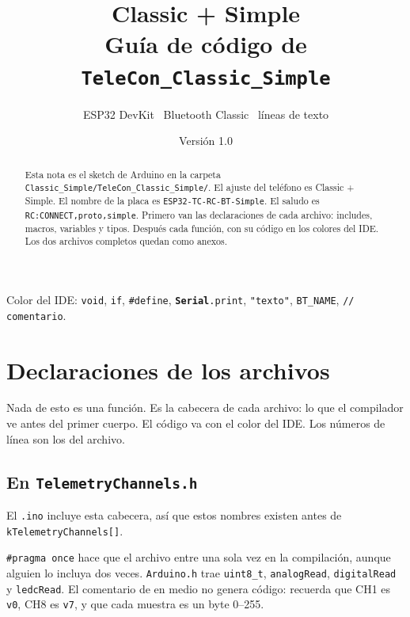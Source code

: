 \documentclass[11pt,a4paper]{article}
\title{Classic + Simple\\[0.25em]
\large Guía de código de \texttt{TeleCon\_Classic\_Simple}}
\author{ESP32 DevKit \textperiodcentered\ Bluetooth Classic \textperiodcentered\ líneas de texto}
\date{Versión 1.0 \quad 2026}
\newcommand{\nm}[1]{\textcolor{ArduinoName}{\texttt{#1}}}
\newcommand{\fnm}[1]{\textcolor{ArduinoFunc}{\texttt{#1}}}
\newcommand{\typ}[1]{\textcolor{ArduinoType}{\texttt{#1}}}
\newcommand{\kw}[1]{\textcolor{ArduinoControl}{\texttt{#1}}}
\newcommand{\str}[1]{\textcolor{ArduinoString}{\texttt{#1}}}
\newcommand{\channelfile}{../../../ESP32_noCam/Classic_Simple/TeleCon_Classic_Simple/TelemetryChannels.h}
\newcommand{\hsnippet}[2]{%
  \par\addvspace{1.35em}%
}
\begin{document}
\maketitle

\begin{abstract}
Esta nota es el sketch de Arduino en la carpeta
\texttt{Classic\_Simple/TeleCon\_Classic\_Simple/}.
El ajuste del teléfono es Classic + Simple. El nombre de la placa es
\str{ESP32-TC-RC-BT-Simple}. El saludo es
\str{RC:CONNECT,proto,simple}.
Primero van las declaraciones de cada archivo: includes, macros,
variables y tipos. Después cada función, con su código en los colores
del IDE.
Los dos archivos completos quedan como anexos.
\end{abstract}

{\sffamily\scriptsize
Color del IDE:
\textcolor{ArduinoType}{\texttt{void}},
\textcolor{ArduinoControl}{\texttt{if}},
\textcolor{ArduinoControl}{\texttt{\#define}},
\textcolor{ArduinoFunc}{\textbf{\texttt{Serial}}}\textcolor{ArduinoFunc}{\texttt{.print}},
\textcolor{ArduinoString}{\texttt{"texto"}},
\textcolor{ArduinoName}{\texttt{BT\_NAME}},
\textcolor{ArduinoComment}{\texttt{// comentario}}.}

\tableofcontents
\clearpage

\section{Declaraciones de los archivos}
\label{sec:decl}

Nada de esto es una función. Es la cabecera de cada archivo: lo que
el compilador ve antes del primer cuerpo. El código va con el color
del IDE. Los números de línea son los del archivo.

\subsection{En \texttt{TelemetryChannels.h}}

El \texttt{.ino} incluye esta cabecera, así que estos nombres existen
antes de \nm{kTelemetryChannels[]}.

\hsnippet{1}{15}

\kw{\#pragma once} hace que el archivo entre una sola vez en la
compilación, aunque alguien lo incluya dos veces. \texttt{Arduino.h}
trae \typ{uint8\_t}, \fnm{analogRead}, \fnm{digitalRead} y
\fnm{ledcRead}. El comentario de en medio no genera código: recuerda
que CH1 es \str{v0}, CH8 es \str{v7}, y que cada muestra es un
byte 0--255.
\end{document}
